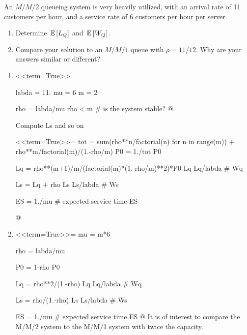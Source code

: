 \begin{question}
  An $M/M/2$ queueing system is very heavily utilized, with an arrival rate of 11 customers per hour, and a  service rate of 6 customers per hour per server.
  \begin{enumerate}
  \item Determine $\,\mathbb{E}\left[L_Q\right]$ and $\,\mathbb{E}\left[W_Q\right]$.
  \item Compare your solution to an $M/M/1$ queue with $\rho=11/12$. Why are your answers similar or different?
  \end{enumerate}
  \begin{solution}
  \begin{enumerate}
  \item 

<<term=True>>=

labda = 11.
mu = 6
m = 2

rho = labda/mu
rho < m  # is the system stable?
@ 

Compute Ls and so on


<<term=True>>=
tot = sum(rho**n/factorial(n) for n in range(m)) + rho**m/factorial(m)/(1.-rho/m)
P0 = 1./tot
P0

Lq = rho**(m+1)/m/(factorial(m)*(1.-rho/m)**2)*P0
Lq
Lq/labda # Wq

Ls = Lq + rho
Ls
Ls/labda # Ws

ES = 1./mu # expected service time
ES

@ 

\item 

<<term=True>>=
mu = m*6

rho = labda/mu

P0 = 1-rho
P0

Lq = rho**2/(1.-rho)
Lq
Lq/labda # Wq

Ls = rho/(1.-rho)
Ls
Ls/labda # Ws

ES = 1./mu # expected service time
ES
@ 
It is of interest to compare the M/M/2 system to the M/M/1 system with twice the capacity. 
  \end{enumerate}
    \end{solution}
\end{question}




